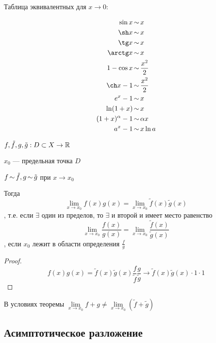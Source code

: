     \begin{example}
        Таблица эквивалентных для $x\to 0$:

        $$
        \begin{aligned}
            \sin x&\equ x \\
            \sh x&\equ x \\
            \tg x&\equ x \\
            \arctg x&\equ x\\
            1-\cos x&\equ \frac{x^2}{2} \\
            \ch x - 1&\equ \frac{x^2}{2} \\
            e^x-1&\equ x \\
            \ln(1+x)&\equ x \\
            (1+x)^\alpha-1&\equ \alpha x \\
            a^x-1&\equ x\ln a
        \end{aligned}
        $$
    \end{example}
    \begin{theorem}
        $f,\tilde f, g, \tilde g:D\subset X \to \mathbb{R}$

        $x_0$ --- предельная точка $D$

        $f\operatorname*{\sim} \tilde f, g\operatorname*{\sim} \tilde g$ при $x\to x_0$

        Тогда $$\lim\limits_{x\to x_0} f(x)g(x)=\lim\limits_{x\to x_0}\tilde f(x)\tilde g(x)$$
        , т.е. если $\exists$ один из пределов, то $\exists$ и второй и имеет место равенство $$\lim\limits_{x\to x_0} \frac{f(x)}{g(x)} = \lim\limits_{x\to x_0} \frac{\tilde f(x)}{\tilde g(x)}$$
        , если $x_0$ лежит в области определения $\frac{f}{g}$
    \end{theorem}
    \begin{proof}
        $$f(x)g(x) = \tilde f(x)\tilde g(x)\frac{f}{\tilde f}\frac{g}{\tilde g}\to \tilde f(x)\tilde g(x) \cdot 1\cdot 1$$
    \end{proof}
    \begin{remark}
        В условиях теоремы $\lim\limits_{x\to x_0} f+g\not=\lim\limits_{x\to x_0} (\tilde f + \tilde g)$
    \end{remark}
    \subsection{Асимптотическое разложение}


